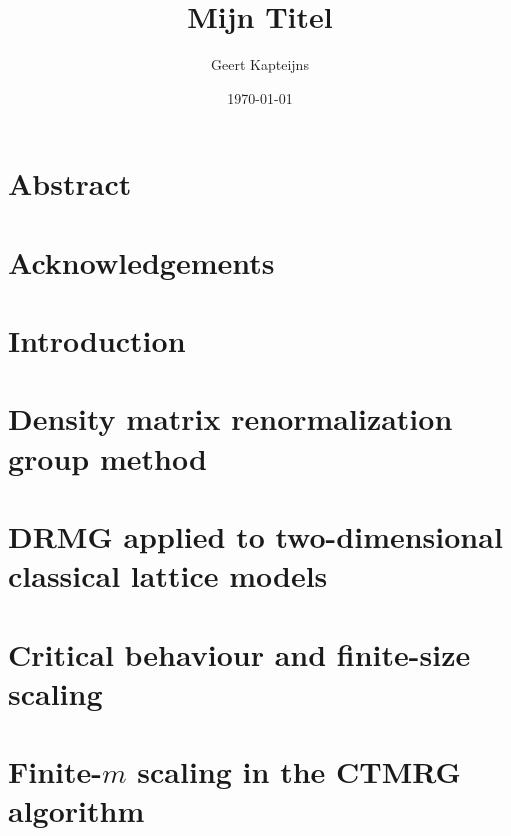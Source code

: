 \documentclass[9pt, ebook, openany, oneside]{memoir}
\renewcommand{\afterchaptertitle}{%
 \vskip2em
 \hrule height 0.6pt
 \vskip2em
 }
\begin{document}
\pagestyle{simple}



\frontmatter

\title{Mijn Titel}
\author{Geert Kapteijns}
\date{\today}

\begin{titlingpage}
  \maketitle
\end{titlingpage}

\begingroup
\renewcommand{\afterchaptertitle}{\vskip1.5em}

\tableofcontents*
\endgroup

\chapter{Abstract}


\chapter{Acknowledgements}


\mainmatter

\chapter{Introduction}


\chapter{Density matrix renormalization group method}


\chapter{DRMG applied to two-dimensional classical lattice models}


\chapter{Critical behaviour and finite-size scaling}


\chapter{Finite-$m$ scaling in the CTMRG algorithm}

%
\end{document}
